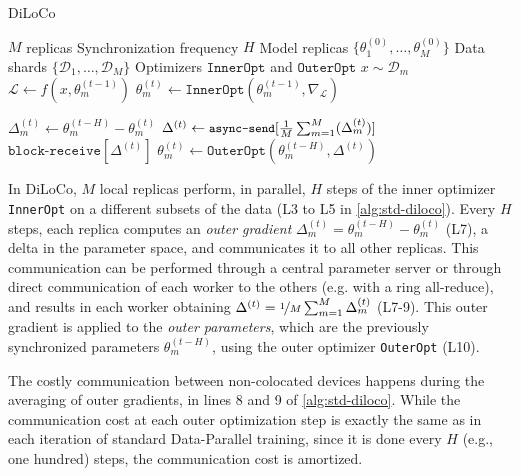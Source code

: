 \begin{algorithm}[!h]
\caption{DiLoCo} \label{alg:std-diloco}
\begin{algorithmic}[1]
\Require $M$ replicas
\Require Synchronization frequency $H$
\Require Model replicas $\{\theta^{(0)}_1, \dots, \theta^{(0)}_M\}$
\Require Data shards $\{\mathcal{D}_1, \dots, \mathcal{D}_M\}$
\Require Optimizers $\texttt{InnerOpt}$ and $\texttt{OuterOpt}$
    \State $x \sim \mathcal{D}_m$
    \State $\mathcal{L} \gets f(x, \theta_m^{(t-1)})$
    \State $\theta_m^{(t)} \gets \texttt{InnerOpt}(\theta_m^{(t-1)}, \nabla_\mathcal{L})$
    \item[]
        \State $\Delta^{(t)}_{m} \gets \theta^{(t-H)}_{m} - \theta_{m}^{(t)}$
        \State $\Delta^{(t)} \gets {\small \texttt{async-send}}[\frac{1}{M} \sum_{m=1}^M (\Delta^{(t)}_{m})]$
        \State $\texttt{block-receive}[{\Delta^{(t)}}]$
        \State $\theta_m^{(t)} \gets \texttt{OuterOpt}(\theta_m^{(t-H)}, \Delta^{(t)})$
    \EndIf
\EndFor
\EndParFor
\end{algorithmic}
\end{algorithm}

In DiLoCo, $M$ local replicas perform, in parallel, $H$ steps of the inner optimizer \texttt{InnerOpt} on a different subsets of the data (L3 to L5 in \autoref{alg:std-diloco}). Every $H$ steps, each replica computes an \textit{outer gradient} $\Delta_m^{(t)} = \theta_m^{(t-H)} - \theta_m^{(t)}$ (L7), a delta in the parameter space, and communicates it to all other replicas. This communication can be performed through a central parameter server or through direct communication of each worker to the others (e.g. with a ring all-reduce), and results in each worker obtaining $\Delta^{(t)} = \nicefrac{1}{M} \sum_{m=1}^M \Delta^{(t)}_m$ (L7-9). This outer gradient is applied to the \textit{outer parameters}, which are the previously synchronized parameters $\theta_m^{(t-H)}$, using the outer optimizer \texttt{OuterOpt} (L10). 

The costly communication between non-colocated devices happens during the averaging of outer gradients, in lines 8 and 9 of \autoref{alg:std-diloco}. While the communication cost at each outer optimization step is exactly the same as in each iteration of standard Data-Parallel training, since it is done every $H$ (e.g., one hundred) steps, the communication cost is amortized.

